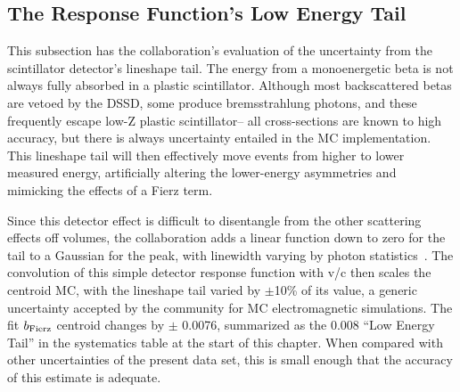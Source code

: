 


\FloatBarrier
\subsection{The Response Function's Low Energy Tail}

This subsection has the collaboration's evaluation of the uncertainty from
the scintillator detector's lineshape tail.
The energy from a monoenergetic beta is not always fully absorbed
in a plastic scintillator.
Although most backscattered betas are vetoed by the DSSD,
some produce bremsstrahlung photons,
and these frequently escape low-Z plastic scintillator-- all cross-sections
are known to high accuracy, but there is always uncertainty entailed in  the
MC implementation.
This lineshape tail will then effectively move events from higher to lower measured
energy, artificially altering the lower-energy asymmetries and mimicking the effects of a
Fierz term.

Since this detector effect is difficult to disentangle from the other scattering
effects off volumes,
the collaboration adds a linear function down to zero for the tail to
a Gaussian for the peak,
with linewidth varying by photon statistics~\cite{clifford}.
The convolution of this simple detector response function with v/c then scales the
centroid MC, with the lineshape tail varied by $\pm$10\% of its value,
a generic uncertainty accepted by the community for MC electromagnetic simulations.
The fit $b_{\rm Fierz}$ centroid changes by $\pm$ 0.0076, summarized
as the 0.008 ``Low Energy Tail'' in the systematics table at the start of this chapter.
When compared with other uncertainties of the present data set,
this is small enough that the accuracy of this estimate is adequate.

